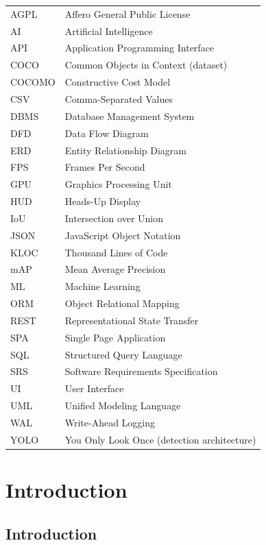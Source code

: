 \documentclass[
12pt,
a4paper,
oneside
]{report}
\begin{document}
\begin{longtable}{p{4cm}p{9cm}}
AGPL & Affero General Public License \\
AI & Artificial Intelligence \\
API & Application Programming Interface \\
COCO & Common Objects in Context (dataset) \\
COCOMO & Constructive Cost Model \\
CSV & Comma-Separated Values \\
DBMS & Database Management System \\
DFD & Data Flow Diagram \\
ERD & Entity Relationship Diagram \\
FPS & Frames Per Second \\
GPU & Graphics Processing Unit \\
HUD & Heads-Up Display \\
IoU & Intersection over Union \\
JSON & JavaScript Object Notation \\
KLOC & Thousand Lines of Code \\
mAP & Mean Average Precision \\
ML & Machine Learning \\
ORM & Object Relational Mapping \\
REST & Representational State Transfer \\
SPA & Single Page Application \\
SQL & Structured Query Language \\
SRS & Software Requirements Specification \\
UI & User Interface \\
UML & Unified Modeling Language \\
WAL & Write-Ahead Logging \\
YOLO & You Only Look Once (detection architecture) \\
\end{longtable}

\newpage


\chapter{Introduction}

\section{Introduction}
\end{document}
